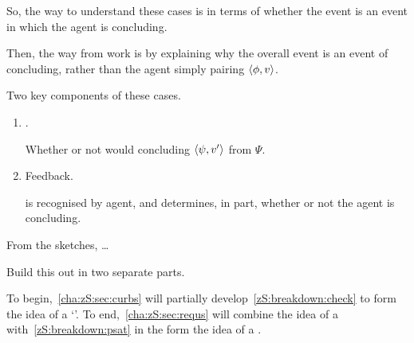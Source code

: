 \begin{note}
  So, the way to understand these cases is in terms of whether the event is an event in which the agent is concluding.

  Then, the way  from  work is by explaining why the overall event is an event of concluding, rather than the agent simply pairing \(\langle \phi, v \rangle\).
\end{note}

\begin{note}
  Two key components of these cases.
  \begin{enumerate}[label=\Roman*., ref=(\Roman*)]
  \item
    \label{zS:breakdown:check}
    .

    Whether or not would concluding \(\langle \psi, v' \rangle\) from \(\Psi\).
  \item
    \label{zS:breakdown:psat}
    Feedback.

    \check{} is recognised by agent, and determines, in part, whether or not the agent is concluding.
  \end{enumerate}

  From the sketches, {\color{red} \dots}
\end{note}

\begin{note}
  Build this out in two separate parts.

  To begin,~\autoref{cha:zS:sec:curbs} will partially develop~\ref{zS:breakdown:check} to form the idea of a `\curb{}'.
  To end,~\ref{cha:zS:sec:requs} will combine the idea of a \curb{} with~\ref{zS:breakdown:psat} in the form the idea of a \requ{}.
\end{note}

